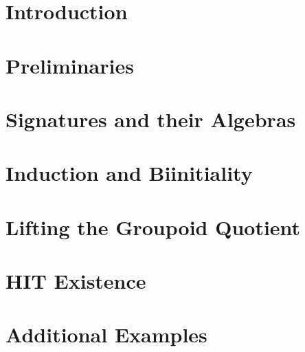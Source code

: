 \documentclass[screen]{acmart}
\theoremstyle{plain}
\theoremstyle{definition}
\begin{document}



\maketitle

\section{Introduction}


\section{Preliminaries}
\label{sec:prelims}


\section{Signatures and their Algebras}
\label{sec:signs}


\section{Induction and Biinitiality}
\label{sec:induction}


\section{Lifting the Groupoid Quotient}
\label{sec:biadj}


\section{HIT Existence}
\label{sec:existence}


\section{Additional Examples}
\label{sec:examples}

\end{document}
